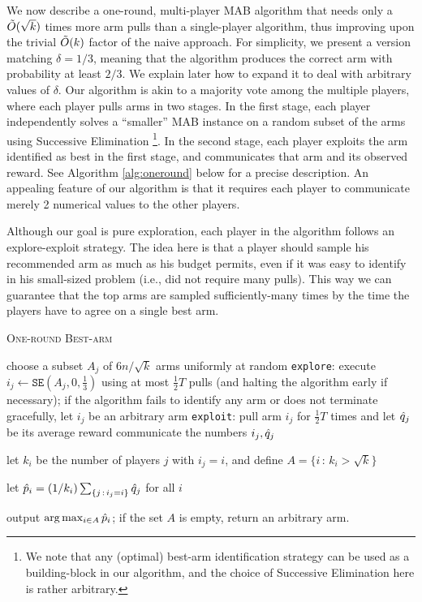 We now describe a one-round, multi-player MAB algorithm that needs only a
$\tilde{O}(\sqrt{k})$ times more arm pulls than a single-player algorithm, thus
improving upon the trivial $\tilde{O}(k)$ factor of the naive approach. For simplicity, we present a version matching $\delta=1/3$, meaning that the algorithm produces the correct arm with probability at least $2/3$. We explain later how to expand it to deal with arbitrary values of $\delta$. 
Our algorithm is akin to a majority vote among the multiple players, where
each player pulls arms in two stages. In the first stage, each
player independently solves a ``smaller'' MAB instance on a random subset of the
arms using Successive Elimination%
\footnote{We note that any (optimal) best-arm
identification strategy can be used as a building-block in our algorithm, and
the choice of Successive Elimination here is rather arbitrary.}.
In the second stage, each player exploits the arm identified as best in the first stage, and
communicates that arm and its observed reward. See Algorithm \ref{alg:oneround}
below for a precise description.
An appealing feature of our algorithm is that it requires each player to
communicate merely 2 numerical values to the other players. 

Although our goal is pure exploration, each player in the algorithm follows an
explore-exploit strategy. 
The idea here is that a player should sample his recommended arm as much as his
budget permits, even if it was easy to identify in his small-sized problem
(i.e., did not require many pulls).  
This way we can guarantee that the top arms are sampled sufficiently-many times
by the time the players have to agree on a single best arm. 


\begin{algorithm} \caption{\textsc{One-round Best-arm}} \label{alg:oneround}
\begin{algorithmic}[1]


	\STATE choose a subset $A_j$ of $6 n / \sqrt{k}$ arms uniformly at random
	\STATE \texttt{explore}: execute $i_j \gets \texttt{SE}(A_j,0,\tfrac{1}{3})$ using at most $\tfrac{1}{2} T$ pulls (and halting the algorithm early if necessary); if the algorithm fails to identify any arm or does not terminate gracefully, let $i_j$ be an arbitrary arm
	\STATE \texttt{exploit}: pull arm $i_j$ for $\tfrac{1}{2} T$ times and let $\hat{q}_j$ be its average reward
	\STATE communicate the numbers $i_j, \hat{q}_j$
\ENDFOR

\STATE let $k_i$ be the number of players $j$ with $i_j = i$, and 
define $A = \{i \,:\, k_i > \sqrt{k} \}$

\STATE let $\hat{p}_i = (1/k_i) \sum_{\{j \,:\, i_j = i\}} \hat{q}_j$ for all $i$

\STATE output $\arg \max_{i \in A} \hat{p}_i$; if the set $A$ is empty, return an arbitrary arm. 

\end{algorithmic}
\end{algorithm}





